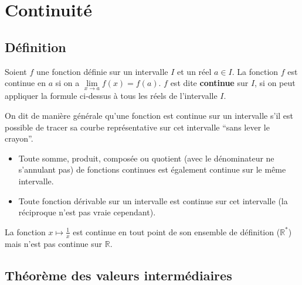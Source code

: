 



	\section{Continuité}

	\subsection{Définition}

	\begin{formula}[Définition]
		Soient $f$ une fonction définie sur un intervalle $I$ et un réel $a \in I$. La fonction $f$ est continue en $a$ si on a $\lim\limits_{x \rightarrow a} f(x) = f(a)$.
		\newpar
		$f$ est dite \textbf{continue} sur $I$, si on peut appliquer la formule ci-dessus à tous les réels de l'intervalle $I$.
	\end{formula}

	On dit de manière générale qu'une fonction est continue sur un intervalle s'il est possible de tracer sa courbe représentative sur cet intervalle ``sans lever le crayon''.

	\begin{formula}
		\entretitreetliste
		\begin{itemize}
			\item Toute somme, produit, composée ou quotient (avec le dénominateur ne s'annulant pas) de fonctions continues est également continue sur le même intervalle.
			\item Toute fonction dérivable sur un intervalle est continue sur cet intervalle (la réciproque n'est pas vraie cependant).
		\end{itemize}
	\end{formula}

	\begin{tip}[Exemple]
		La fonction $x \mapsto \frac{1}{x}$ est continue en tout point de son ensemble de définition ($\mathbb{R}^{*}$) mais n'est pas continue sur $\mathbb{R}$.
	\end{tip}

	\subsection{Théorème des valeurs intermédiaires}

